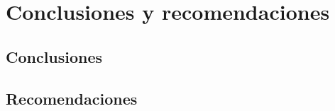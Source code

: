 
\chapter{Conclusiones y recomendaciones}\label{ch:conclusions}
\section{Conclusiones}

\section{Recomendaciones}
